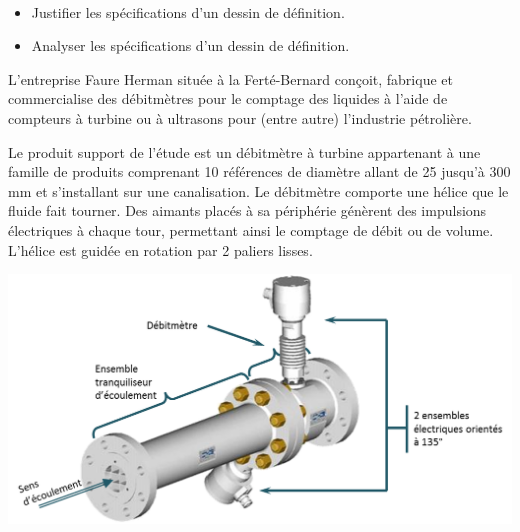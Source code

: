 \documentclass[10pt,fleqn]{article} %
\begin{document}

\vspace{7cm}
\pagestyle{fancy}
\thispagestyle{plain}


\def\columnseprulecolor{\color{ocre}}
\setlength{\columnseprule}{0.4pt} 

\begin{multicols}{2}

\begin{obj}~\\
\begin{itemize}
\item Justifier les spécifications d'un dessin de définition.
\item Analyser les spécifications d'un dessin de définition.
\end{itemize}
\end{obj}


L’entreprise Faure Herman située à la Ferté-Bernard conçoit, fabrique et commercialise des débitmètres pour le comptage des liquides à l’aide de compteurs à turbine ou à ultrasons pour (entre autre) l'industrie pétrolière.

Le produit support de l’étude est un débitmètre à turbine appartenant à une famille de produits comprenant 10 références de diamètre allant de 25 jusqu'à 300 mm et s’installant sur une canalisation. Le débitmètre comporte une hélice que le fluide fait tourner. Des aimants placés à sa périphérie génèrent des impulsions électriques à chaque tour, permettant ainsi le comptage de débit ou de volume. L’hélice est guidée en rotation par 2 paliers lisses.

\begin{center}
\includegraphics[width=\linewidth]{images/debitmetre_02}
\end{center}


\end{multicols}
\end{document}
